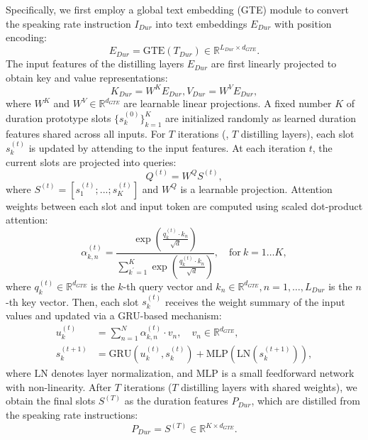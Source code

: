 Specifically, we first employ a global text embedding (GTE) module to convert the speaking rate instruction $I_{Dur}$ into text embeddings $E_{Dur}$ with position encoding:
\begin{equation}
     E_{Dur} = \mathrm{GTE}(T_{Dur})\in \mathbb{R}^{L_{Dur}\times d_{GTE}}.
\end{equation}
The input features of the distilling layers $E_{Dur}$ are first linearly projected to obtain key and value representations:
\begin{equation}
     K_{Dur} = W^KE_{Dur}, V_{Dur} = W^VE_{Dur}, 
\end{equation}
where $W^K$ and $W^V \in \mathbb{R}^{d_{GTE}} $ are learnable linear projections.
A fixed number $K$ of duration prototype slots $\{s^{(0)}_k\}^K_{k=1}$ are initialized randomly as learned duration features shared across all inputs.
For $T$ iterations (\ie, $T$ distilling layers), each slot $s_k^{(t)}$ is updated by attending to the input features. 
At each iteration $t$, the current slots are projected into queries:
\begin{equation}
     Q^{(t)}=W^QS^{(t)}, 
\end{equation}
where $S^{(t)} = [s_1^{(t)};...;s_K^{(t)}]$ and $W^Q$ is a learnable projection.
Attention weights between each slot and input token are computed using scaled dot-product attention:
\begin{equation}
     \alpha_{k,n}^{(t)}=\frac{\exp\left(\frac{q_k^{(t)}\cdot k_n}{\sqrt{d}}\right)}{\sum_{k^{\prime}=1}^K\exp\left(\frac{q_k^{(t)}\cdot k_n}{\sqrt{d}}\right)},\quad\mathrm{for~}k=1\ldots K,
\end{equation}
where $q_k^{(t)}\in \mathbb{R}^{d_{GTE}}$ is the $k$-th query vector and $k_n \in \mathbb{R}^{d_{GTE}}, n=1,\ldots,L_{Dur}$ is the $n$-th key vector.
Then, each slot $s_k^{(t)}$ receives the weight summary of the input values and updated via a GRU-based mechanism:
\begin{equation}
\begin{split}
    u_k^{(t)}&=\sum_{n=1}^N\alpha_{k,n}^{(t)}\cdot v_n,\quad v_n\in\mathbb{R}^{d_{GTE}},
    \\ s_k^{(t+1)}&=\mathrm{GRU}(u_k^{(t)},s_k^{(t)})+\mathrm{MLP}(\mathrm{LN}(s_k^{(t+1)})),
    \end{split}
\end{equation}
where $\mathrm{LN}$ denotes layer normalization, and $\mathrm{MLP}$ is a small feedforward network with non-linearity.
After $T$ iterations ($T$ distilling layers with shared weights), we obtain the final slots $S^{(T)}$ as the duration features $P_{Dur}$, which are distilled from the speaking rate instructions:
\begin{equation}
     P_{Dur} = S^{(T)} \in \mathbb{R}^{K\times d_{GTE}}.
\end{equation}

